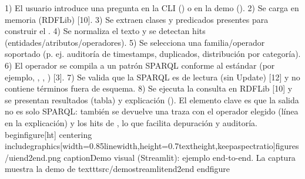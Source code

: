 {}1)  El usuario introduce una pregunta en la CLI () o en la demo (). 2)  Se carga  en memoria (RDFLib) [10]. 3)  Se extraen clases y predicados presentes para construir el . 4)  Se normaliza el texto y se detectan hits (entidades/atributos/operadores). 5)  Se selecciona una familia/operador soportado (p. ej. auditoría de timestamps, duplicados, distribución por categoría). 6)  El operador se compila a un patrón SPARQL conforme al estándar (por ejemplo, , , ) [3]. 7)  Se valida que la SPARQL es de lectura (sin Update) [12] y no contiene términos fuera de esquema. 8)  Se ejecuta la consulta en RDFLib [10] y se presentan resultados (tabla) y explicación ().\markdownRendererInterblockSeparator
{}El elemento clave es que la salida no es solo SPARQL: también se devuelve una traza con el operador elegido (línea  en la explicación) y los hits de , lo que facilita depuración y auditoría.\markdownRendererInterblockSeparator
{}\markdownRendererBackslash{}begin\markdownRendererLeftBrace{}figure\markdownRendererRightBrace{}[ht] \markdownRendererBackslash{}centering \markdownRendererBackslash{}includegraphics[width=0.85\markdownRendererBackslash{}linewidth,height=0.7\markdownRendererBackslash{}textheight,keepaspectratio]\markdownRendererLeftBrace{}figures/uiend2end.png\markdownRendererRightBrace{} \markdownRendererBackslash{}caption\markdownRendererLeftBrace{}Demo visual (Streamlit): ejemplo end-to-end. La captura muestra la demo de \markdownRendererBackslash{}texttt\markdownRendererLeftBrace{}src/demostreamlit\markdownRendererUnderscore{}end2end\markdownRendererRightBrace{} \markdownRendererBackslash{}end\markdownRendererLeftBrace{}figure\markdownRendererRightBrace{}\markdownRendererInterblockSeparator
